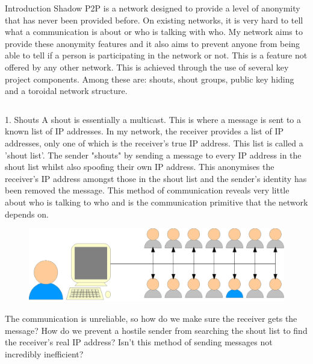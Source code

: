 \documentclass[ %
                    author={Luke Murray},
                supervisor={Dr. Simon Hollis},
                     title={Shadow Peer-to-Peer Networks},
                  subtitle={},
                    degree={MEng},
                      year={2013} ]{poster}
\begin{document}

\begin{frame}{} 

\vfill

\begin{columns}[t]
    \begin{column}{0.900\linewidth}
    \begin{block}{\normalsize Introduction}
    \small Shadow P2P is a network designed to provide a level of anonymity that has never been provided before. On existing networks, it is very hard to tell what a communication is about or who is talking with who. My network aims to provide these anonymity features and it also aims to prevent anyone from being able to tell if a person is participating in the network or not. This is a feature not offered by any other network. This is achieved through the use of several key project components. Among these are: shouts, shout groups, public key hiding and a toroidal network structure.
    \end{block}
    \end{column}
\end{columns}

\vfill

\begin{columns}[t]
    \begin{column}{0.422\linewidth}
    \begin{block}{\normalsize 1. Shouts}
    \small A shout is essentially a multicast. This is where a message is sent to a known list of IP addresses. In my network, the receiver provides a list of IP addresses, only one of which is the receiver's true IP address. This list is called a 'shout list'. The sender "shouts" by sending a message to every IP address in the shout list whilst also spoofing their own IP address. This anonymises the receiver's IP address amongst those in the shout list and the sender's identity has been removed the message. This method of communication reveals very little about who is talking to who and is the communication primitive that the network depends on.
    \begin{figure}[h]
        \includegraphics{poster_d2.eps}
    \end{figure}
    The communication is unreliable, so how do we make sure the receiver gets the message? How do we prevent a hostile sender from searching the shout list to find the receiver's real IP address? Isn't this method of sending messages not incredibly inefficient?
    \end{block}
    \end{column}


\end{columns}
\end{frame}
\end{document}
